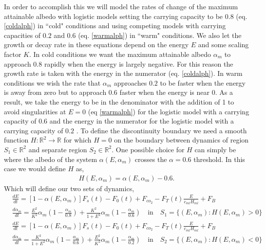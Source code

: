 \documentclass[10pt]{article}
\begin{document}
In order to accomplish this we will model the rates of change of the maximum attainable albedo with logistic models setting the carrying capacity to be $0.8$ (eq. \ref{coldalph}) in ``cold" conditions and using competing models with carrying capacities of $0.2$ and  $0.6$ (eq. \ref{warmalph}) in ``warm" conditions. We also let the growth or decay rate in these equations depend on the energy $E$ and some scaling factor $K$. In cold conditions we want the maximum attainable albedo $\alpha_m$ to approach $0.8$ rapidly when the energy is largely negative. For this reason the growth rate is taken with the energy in the numerator (eq. \ref{coldalph}). In warm conditions we wish the rate that $\alpha_m$ approaches $0.2$ to be faster when the energy is away from zero but to approach $0.6$ faster when the energy is near 0.  As a result, we take the energy to be in the denominator with the addition of 1 to avoid singularities at $E=0$ (eq \ref{warmalph}) for the logistic model with a carrying capacity of $0.6$ and the energy in the numerator for the logistic model with a carrying capacity of $0.2$ . 
To define the discontinuity boundary we need a smooth function $H: \mathbb{R}^2 \rightarrow \mathbb{R}$ for which $H=0$ on the boundary between dynamics  of region $S_1 \in \mathbb{R}^2$ and separate region $S_2 \in \mathbb{R}^2$. One possible choice for $H$ can simply be where the albedo of the system $\alpha(E,\alpha_m)$ crosses the $\alpha=0.6$ threshold. In this case we would define $H$ as,
\begin{align}
H(E,\alpha_m)=\alpha(E,\alpha_m)-0.6 \label{H}.
\end{align}
Which will define our two sets of dynamics,
{\small
\begin{align}
&\frac{dE}{dt}=[1-\alpha(E,\alpha_{m})]F_s(t)-F_0(t)+F_{co_2}-F_T(t)\frac{E}{c_{ml} H_{ml}}+F_B &\nonumber \\
&\frac{d \alpha_{m}}{dt}= \frac{E^2}{K^2}\alpha_{m}\left(1-\frac{\alpha_{m}}{0.8}\right) + \frac{K^2}{1+E^2}\alpha_{m}\left(1-\frac{\alpha_{m}}{0.6}\right) \quad \textrm{in}  \quad S_1=\{(E,\alpha_m): H(E,\alpha_m)>0\} &\label{coldalph} \\
&\frac{dE}{dt}=[1-\alpha(E,\alpha_{m})]F_s(t)-F_0(t)+F_{co_2}-F_T(t)\frac{E}{c_{ml} H_{ml}}+F_B &\nonumber \\
&\frac{ d \alpha_{m}}{dt}=\frac{K^2}{1+E^2}\alpha_{m}\left(1-\frac{\alpha_{m}}{0.6}\right) +\frac{E^2}{K^2}\alpha_{m}\left(1-\frac{\alpha_{m}}{0.2}\right) \quad \textrm{in}  \quad S_2=\{(E,\alpha_m): H(E,\alpha_m)<0\}&\label{warmalph}
\end{align}}
\end{document}
